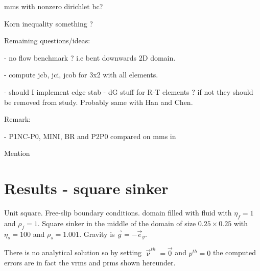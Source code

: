 mms with nonzero dirichlet bc?

Korn inequality something ?



Remaining questions/ideas:

- no flow benchmark ? i.e bent downwards 2D domain. 

- compute jcb, jci, jcob for 3x2 with all elements.

- should I implement edge stab - dG stuff for R-T elements ? if not they should be  
removed from study. Probably same with Han and Chen.

Remark:

- P1NC-P0, MINI, BR and P2P0 compared on mms in \cite{cakp15}

Mention  





\newpage
\section*{Results - square sinker}

Unit square. Free-slip boundary conditions. domain filled with fluid with $\eta_f=1$ and $\rho_f=1$.
Square sinker in the middle of the domain of size $0.25\times 0.25$ with $\eta_s=100$ and
$\rho_s=1.001$. Gravity is $\vec{g}=-\vec{e}_y$. 

There is no analytical solution so by setting $\vec{\upnu}^{th}=\vec{0}$ and 
$p^{th}=0$ the computed errors are in fact the vrms and prms shown hereunder.





